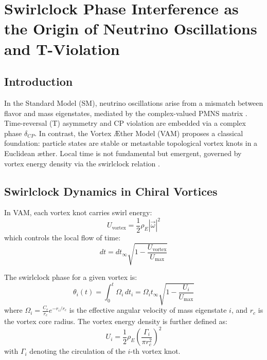 \section{Swirlclock Phase Interference as the Origin of Neutrino Oscillations and T-Violation}

\subsection{Introduction}

In the Standard Model (SM), neutrino oscillations arise from a mismatch between flavor and mass eigenstates, mediated by the complex-valued PMNS matrix \cite{pontecorvo1957inverse, mns1962neutrino}. Time-reversal (T) asymmetry and CP violation are embedded via a complex phase \( \delta_{CP} \). In contrast, the Vortex \AE ther Model (VAM) proposes a classical foundation: particle states are stable or metastable topological vortex knots in a Euclidean \ae ther. Local time is not fundamental but emergent, governed by vortex energy density via the swirlclock relation \cite{iskandarani2025vam2}.

\subsection{Swirlclock Dynamics in Chiral Vortices}

In VAM, each vortex knot carries swirl energy:
\begin{equation}
U_\text{vortex} = \frac{1}{2} \rho_{\scriptscriptstyle\boldsymbol\!E} |\vec{\omega}|^2
\end{equation}
which controls the local flow of time:
\begin{equation}
dt = dt_\infty \sqrt{1 - \frac{U_\text{vortex}}{U_\text{max}}}
\end{equation}

The swirlclock phase for a given vortex is:
\begin{equation}
\theta_i(t) = \int_0^t \Omega_i \, dt_i = \Omega_i t_\infty \sqrt{1 - \frac{U_i}{U_\text{max}}}
\end{equation}
where \( \Omega_i = \frac{C_e}{r_c} e^{-r_i/r_c} \) is the effective angular velocity of mass eigenstate \( i \), and \( r_c \) is the vortex core radius. The vortex energy density is further defined as:
\begin{equation}
U_i = \frac{1}{2} \rho_{\scriptscriptstyle\boldsymbol\!E}\left( \frac{\Gamma_i}{\pi r_c^2} \right)^2
\end{equation}
with \( \Gamma_i \) denoting the circulation of the \( i \)-th vortex knot.

